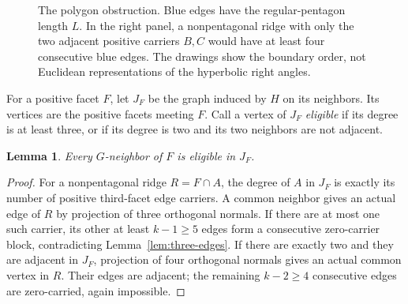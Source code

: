 \documentclass[11pt]{article}
\newtheorem{lemma}[theorem]{Lemma}
\theoremstyle{remark}
\begin{document}
\begin{figure}[tb]
\centering
{}
\caption{The polygon obstruction. Blue edges have the regular-pentagon
length $L$. In the right panel, a nonpentagonal ridge with only the
two adjacent positive carriers $B,C$ would have at least four consecutive
blue edges. The drawings show the boundary order, not Euclidean
representations of the hyperbolic right angles.}
\label{fig:pentagon-chain}
\end{figure}

For a positive facet $F$, let $J_F$ be the graph induced by $H$ on
its neighbors. Its vertices are the positive facets meeting $F$.
Call a vertex of $J_F$ \emph{eligible} if its degree is at least three,
or if its degree is two and its two neighbors are not adjacent.

\begin{lemma}\label{lem:eligibility}
Every $G$-neighbor of $F$ is eligible in $J_F$.
\end{lemma}
\begin{proof}
For a nonpentagonal ridge $R=F\cap A$, the degree of $A$ in $J_F$
is exactly its number of positive third-facet edge carriers. A common
neighbor gives an actual edge of $R$ by projection of three orthogonal
normals. If there are at most one such carrier, its other at least
$k-1\ge5$ edges form a consecutive zero-carrier block, contradicting
Lemma~\ref{lem:three-edges}. If there are exactly two and they are
adjacent in $J_F$, projection of four orthogonal normals gives an
actual common vertex in $R$. Their edges are adjacent; the remaining
$k-2\ge4$ consecutive edges are zero-carried, again impossible.
\end{proof}
\end{document}
